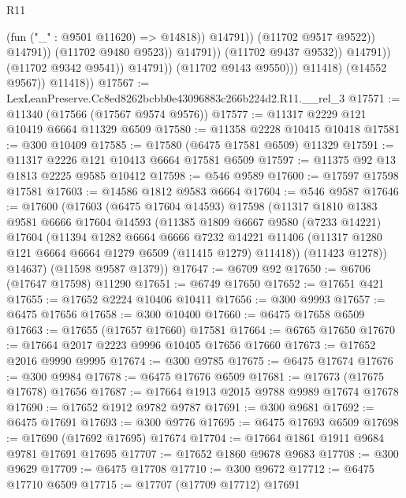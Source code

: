\begin{lexlean}{R11}
\begin{coremodule}
                                              (fun ("_" : @9501 @11620) => @14818))
                                            @14791))
                                        (@11702 @9517 @9522))
                                      @14791))
                                  (@11702 @9480 @9523))
                                @14791))
                            (@11702 @9437 @9532))
                          @14791))
                      (@11702 @9342 @9541))
                    @14791))
                (@11702 @9143 @9550)))
            @11418)
          (@14552 @9567))
        @11418))
@17567 := LexLeanPreserve.Cc8ed8262bcbb0e43096883c266b224d2.R11.__rel_3
@17571 := @11340 (@17566 (@17567 @9574 @9576))
@17577 := @11317 @2229 @121 @10419 @6664 @11329 @6509
@17580 := @11358 @2228 @10415 @10418
@17581 := @300 @10409
@17585 := @17580 (@6475 @17581 @6509) @11329
@17591 := @11317 @2226 @121 @10413 @6664 @17581 @6509
@17597 := @11375 @92 @13 @1813 @2225 @9585 @10412
@17598 := @546 @9589
@17600 := @17597 @17598 @17581
@17603 := @14586 @1812 @9583 @6664
@17604 := @546 @9587
@17646 := @17600
    (@17603
      (@6475 @17604 @14593)
      @17598
      (@11317
        @1810
        @1383
        @9581
        @6666
        @17604
        @14593
        (@11385
          @1809
          @6667
          @9580
          (@7233 @14221)
          @17604
          (@11394
            @1282
            @6664
            @6666
            @7232
            @14221
            @11406
            (@11317 @1280 @121 @6664 @6664 @1279 @6509 (@11415 @1279) @11418))
          (@11423 @1278))
        @14637)
      (@11598 @9587 @1379))
@17647 := @6709 @92
@17650 := @6706 (@17647 @17598) @11290
@17651 := @6749 @17650
@17652 := @17651 @421
@17655 := @17652 @2224 @10406 @10411
@17656 := @300 @9993
@17657 := @6475 @17656
@17658 := @300 @10400
@17660 := @6475 @17658 @6509
@17663 := @17655 (@17657 @17660) @17581
@17664 := @6765 @17650
@17670 := @17664 @2017 @2223 @9996 @10405 @17656 @17660
@17673 := @17652 @2016 @9990 @9995
@17674 := @300 @9785
@17675 := @6475 @17674
@17676 := @300 @9984
@17678 := @6475 @17676 @6509
@17681 := @17673 (@17675 @17678) @17656
@17687 := @17664 @1913 @2015 @9788 @9989 @17674 @17678
@17690 := @17652 @1912 @9782 @9787
@17691 := @300 @9681
@17692 := @6475 @17691
@17693 := @300 @9776
@17695 := @6475 @17693 @6509
@17698 := @17690 (@17692 @17695) @17674
@17704 := @17664 @1861 @1911 @9684 @9781 @17691 @17695
@17707 := @17652 @1860 @9678 @9683
@17708 := @300 @9629
@17709 := @6475 @17708
@17710 := @300 @9672
@17712 := @6475 @17710 @6509
@17715 := @17707 (@17709 @17712) @17691

\end{coremodule}
\end{lexlean}
